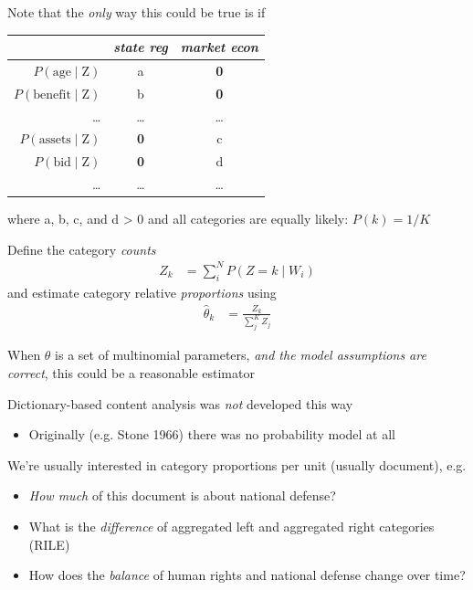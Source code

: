 \documentclass[11pt,compress,professionalfonts]{beamer}
\newcommand{\ita}{\begin{itemize}}
\newcommand{\itm}{\item[]}
\newcommand{\itz}{\end{itemize}}
\begin{document}
Note that the \textit{only} way this could be true is if 
\begin{center}
\begin{tabular}{rcc} \toprule
 & \textsl{state reg} & \textsl{market econ} \\ \midrule
$P(\text{age} \mid \text{Z})$ & a & \textbf{0} \\
$P(\text{benefit} \mid \text{Z})$ & b & \textbf{0} \\
\ldots & \ldots & \ldots\\
$P(\text{assets} \mid  \text{Z})$ & \textbf{0} & c \\
$P(\text{bid}  \mid  \text{Z})$& \textbf{0} & d\\
\ldots & \ldots & \ldots\\ \bottomrule
\end{tabular}
\end{center}
where a, b, c, and d > 0
{and} all categories are equally likely: $P(k)=1/K$



Define the category \textit{counts}
\begin{align*}
Z_k & = \sum^N_{i} P(Z = k \mid W_i)
\end{align*}
and estimate category relative \textit{proportions} using
\begin{align*}
\hat{\theta}_k &= \frac{Z_k}{\sum^K_{j} Z_j}
\end{align*}

When $\theta$ is a set of multinomial parameters, \textit{and the model assumptions are correct},
this could be a reasonable estimator


Dictionary-based content analysis was \textit{not} developed this way
\ita
\itm Originally (e.g. Stone 1966) there was no probability model at all
\itz




We're usually interested in category proportions per unit (usually document), e.g.
\ita
\itm \textsl{How much} of this document is about national defense?
\itm What is the \textsl{difference} of aggregated left and aggregated right categories (RILE)
\itm How does the \textsl{balance} of human rights and national defense change over time?
\itz
\end{document}
